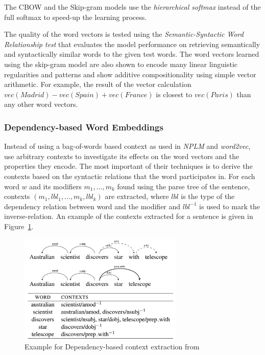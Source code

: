 The CBOW and the Skip-gram models use the \emph{hierarchical softmax} \citep{morin2005hierarchical} instead of the full softmax to speed-up the learning process.

The quality of the word vectors is tested using the \emph{Semantic-Syntactic Word Relationship test} that evaluates the model performance on retrieving semantically and syntactically similar words to the given test words. The word vectors learned using the skip-gram model are also shown to encode many linear linguistic regularities and patterns \citep{mikolov2013linguistic} and show additive compositionality using simple vector arithmetic. For example, the result of the vector calculation $vec(Madrid) - vec(Spain) + vec(France)$ is closest to $vec(Paris)$ than any other word vectors.

\subsubsection{Dependency-based Word Embeddings}
Instead of using a bag-of-words based context as used in \emph{NPLM} 
and \emph{word2vec}, \citet{levy2014dependencybased} use arbitrary 
contexts to investigate its effects on the word vectors and the 
properties they encode. The most important of their techniques is to 
derive the contexts based on the syntactic relations that the word 
participates in. For each word $w$ and its modifiers $m_1, \ldots, m_k$ 
found using the parse tree of the sentence, contexts 
$(m_{1}, lbl_{1}, \ldots, m_{k}, lbl_{k})$ are extracted, where $lbl$ 
is the type of the dependency relation between word and the modifier 
and $lbl^{-1}$ is used to mark the inverse-relation. An example of the 
contexts extracted for a sentence is given in Figure~\ref{fig:dep:context}.
\begin{figure}[h!]
    \centering
        \includegraphics[width=0.7\textwidth]{figs/dependency_context.png}
    \caption{Example for Dependency-based context extraction from \cite{levy2014dependencybased}}
    \label{fig:dep:context}
\end{figure}
